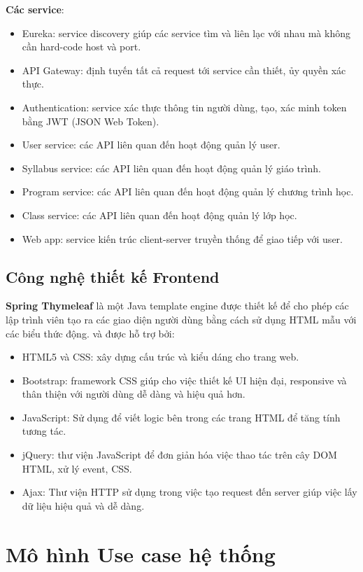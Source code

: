 \documentclass[report.tex]{subfiles}
\begin{document}
\textbf{Các service}:
\begin{itemize}[noitemsep]
\item Eureka: service discovery giúp các service tìm và liên lạc với nhau mà không cần hard-code host và port.
\item API Gateway: định tuyến tất cả request tới service cần thiết, ủy quyền xác thực.
\item Authentication: service xác thực thông tin người dùng, tạo, xác minh token bằng JWT (JSON Web Token).
\item User service: các API liên quan đến hoạt động quản lý user.
\item Syllabus service: các API liên quan đến hoạt động quản lý giáo trình.
\item Program service: các API liên quan đến hoạt động quản lý chương trình học.
\item Class service: các API liên quan đến hoạt động quản lý lớp học.
\item Web app: service kiến trúc client-server truyền thống để giao tiếp với user.
\end{itemize}

\subsection{Công nghệ thiết kế Frontend}

\textbf{Spring Thymeleaf} là một Java template engine được thiết kế để cho phép các lập trình viên tạo ra các giao diện người dùng bằng cách sử dụng HTML mẫu với các biểu thức động.
và được hỗ trợ bởi:

\begin{itemize}[noitemsep]
\item HTML5 và CSS: xây dựng cấu trúc và kiểu dáng cho trang web.
\item Bootstrap: framework CSS giúp cho việc thiết kế UI hiện đại, responsive và thân thiện với người dùng dễ dàng và hiệu quả hơn.
\item JavaScript: Sử dụng để viết logic bên trong các trang HTML để tăng tính tương tác.
\item jQuery: thư viện JavaScript để đơn giản hóa việc thao tác trên cây DOM HTML, xử lý event, CSS.
\item Ajax: Thư viện HTTP sử dụng trong việc tạo request đến server giúp việc lấy dữ liệu hiệu quả và dễ dàng.
\end{itemize}

\section{Mô hình Use case hệ thống}
\end{document}
